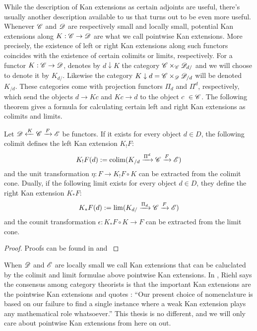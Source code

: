 \documentclass[../../thesis.tex]{subfiles}
\begin{document}
While the description of Kan extensions as certain adjoints are useful, there's usually another description available to us that turns out to be even more useful.
Whenever $\mathscr{C}$ and $\mathscr{D}$ are respectively small and locally small, potential Kan extensions along $K: \mathscr{C} \to \mathscr{D}$ are what we call pointwise Kan extensions.
More precisely, the existence of left or right Kan extensions along such functors coincides with the existence of certain colimits or limits, respectively.
For a functor $K:\mathscr{C} \to \mathscr{D}$, \cite{MacLane} denotes by $d \downarrow K$ the category $\mathscr{C} \times_{\mathscr{C}}\mathscr{D}_{d/}$ and we will choose to denote it by $K_{d/}$.
Likewise the category $K \downarrow d = \mathscr{C} \times_{\mathscr{D}}\mathscr{D}_{/d}$ will be denoted $K_{/d}$.
These categories come with projection functors $\Pi_d$ and $\Pi^d$, respectively, which send the objects $d\to Kc$ and $Kc \to d$ to the object $c \in \C$.
The following theorem gives a formula for calculating certain left and right Kan extensions as colimits and limits.
\begin{theorem}\label{ptwiseKan}
    Let $\mathscr{D} \xleftarrow{K} \mathscr{C} \xrightarrow{F} \mathscr{E}$ be functors.
    If it exists for every object $d\in D$, the following colimit defines the left Kan extension $K_!F$:
    \[
        K_!F(d) : = \operatorname{colim}(K_{/d} \xrightarrow{\Pi^d}\mathscr{C}\xrightarrow{F}\mathscr{E})
    \]
    and the unit transformation $\eta: F \to K_!F\circ K$ can be extracted from the colimit cone.
    Dually, if the following limit exists for every object $d\in D$, they define the right Kan extension $K_*F$:
    \[
        K_*F(d) : = \lim(K_{d/} \xrightarrow{\Pi_d}\mathscr{C} \xrightarrow{F} \mathscr{E})
    \]
    and the counit transformation $\epsilon: K_*F\circ K \to F$ can be extracted from the limit cone.
\end{theorem}
\begin{proof}
    Proofs can be found in \cite[Theorem 6.2.1.]{CatContext} and \cite[Theorem X.3.1.]{MacLane}
\end{proof}
When $\mathscr{D}$ and $\mathscr{E}$ are locally small we call Kan extensions that can be caluclated by the colimit and limit formulae above pointwise Kan extensions.
In \cite{CatContext}, Riehl says the consensus among category theorists is that the important Kan extensions are the pointwise Kan extensions and quotes \cite[§4]{Kelly}:
``Our present choice of nomenclature is based on our failure to find a single instance where a weak Kan extension plays any mathematical role whatsoever.''
This thesis is no different, and we will only care about pointwise Kan extensions from here on out.
\end{document}
